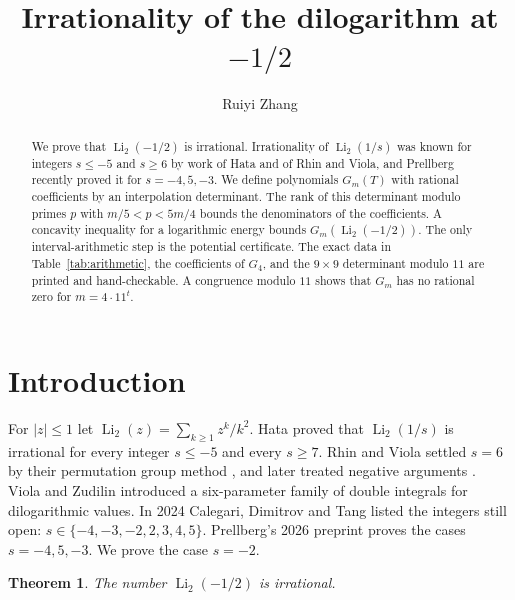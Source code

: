 \documentclass{amsart}
\newtheorem{theorem}{Theorem}
\numberwithin{equation}{section}
\numberwithin{table}{section}
\newcommand{\Li}{\operatorname{Li}}
\begin{document}
\title{Irrationality of the dilogarithm at $-1/2$}
\author{Ruiyi Zhang}
\address{Independent Researcher, Columbia, Maryland, USA}

\begin{abstract}
We prove that $\operatorname{Li}_2(-1/2)$ is irrational. Irrationality of
$\operatorname{Li}_2(1/s)$ was known for integers $s\le-5$ and $s\ge6$ by
work of Hata and of Rhin and Viola, and Prellberg recently proved it for
$s=-4,5,-3$. We define polynomials $G_m(T)$ with rational coefficients by an
interpolation determinant. The rank of this determinant modulo primes
$p$ with $m/5<p<5m/4$
bounds the denominators of the coefficients. A concavity inequality for a
logarithmic energy bounds $G_m(\operatorname{Li}_2(-1/2))$. The only
interval-arithmetic step is the potential certificate. The exact data in
Table~\ref{tab:arithmetic}, the coefficients of $G_4$, and the $9\times9$
determinant modulo $11$ are printed and hand-checkable. A congruence modulo
$11$ shows that $G_m$ has no rational zero for $m=4\cdot11^t$.
\end{abstract}

\maketitle

\section{Introduction}\label{sec:intro}

For $|z|\le1$ let $\Li_2(z)=\sum_{k\ge1}z^k/k^2$.
Hata \cite[Theorem~1.1]{Ha} proved that $\Li_2(1/s)$ is irrational
for every integer $s\le-5$ and every $s\ge7$.
Rhin and Viola settled $s=6$ by their permutation group method
\cite[Section~6]{RV05}, and later treated negative arguments
\cite[Theorem~2.1 and Section~4]{RV19}.
Viola and Zudilin \cite{VZ} introduced a six-parameter family of double
integrals for dilogarithmic values.
In 2024 Calegari, Dimitrov and Tang
\cite[Remark~2.8.2 and Section~15.2]{CDT} listed the integers still open:
$s\in\{-4,-3,-2,2,3,4,5\}$.
Prellberg's 2026 preprint \cite[Theorem~1.1]{Pr} proves the cases $s=-4,5,-3$.
We prove the case $s=-2$.

\begin{theorem}\label{thm:main}
The number $\Li_2(-1/2)$ is irrational.
\end{theorem}
\end{document}
